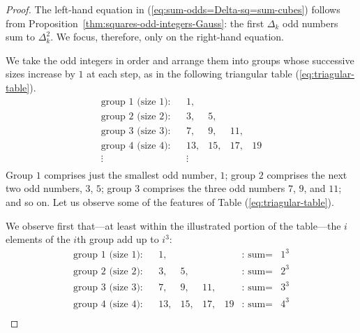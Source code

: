\begin{proof}
The left-hand equation in (\ref{eq:sum-odds=Delta-sq=sum-cubes}) follows from 
Proposition~\ref{thm:squares-odd-integers-Gauss}: the first $\Delta_k$ odd numbers sum
to $\Delta_k^2$.  We focus, therefore, only on the right-hand equation.

\medskip

We take the odd integers in order and arrange them into groups whose successive sizes increase by $1$ at each step, as in the following triangular table (\ref{eq:triagular-table}).
\begin{equation}
\label{eq:triagular-table}
\begin{array}{llrrrrclcc}
\mbox{group $1$ (size $1$):} & &
1,  &    &     &      \\
\mbox{group $2$ (size $2$):} & &
3,  &  5, &     &      \\
\mbox{group $3$ (size $3$):} & &
7,  &  9, & 11, &     \\
\mbox{group $4$ (size $4$):} & &
13, & 15, & 17, & 19   \\
\vdots & & \vdots \\
\end{array}
\end{equation}
Group $1$ comprises just the smallest odd number, $1$; group $2$ comprises the next two odd numbers, $3$, $5$; group $3$ comprises the three odd numbers $7$,  $9$,  and $11$; and so on.  Let us observe some of the features of Table (\ref{eq:triagular-table}).

We observe first that---at least within the illustrated portion of the table---the $i$ elements of the $i$th group add up to $i^3$:
\[
\begin{array}{llrrrrclcc}
\mbox{group $1$ (size $1$):} & &
1,  &    &     &     & \mbox{: sum} = &  1^3 \\
\mbox{group $2$ (size $2$):} & &
3,  &  5, &     &    & \mbox{: sum} =  &  2^3 \\
\mbox{group $3$ (size $3$):} & &
7,  &  9, & 11, &    &  \mbox{: sum} = &  3^3 \\
\mbox{group $4$ (size $4$):} & &
13, & 15, & 17, & 19 & \mbox{: sum} =  &  4^3 \\
\end{array}
\]


\end{proof}
